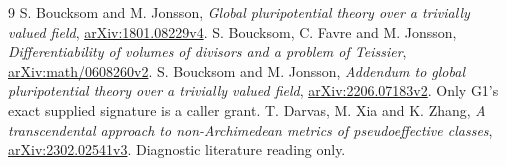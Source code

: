 \documentclass[10pt]{article}
\begin{document}
\begin{thebibliography}{9}
 S. Boucksom and M. Jonsson,
\emph{Global pluripotential theory over a trivially valued field},
\href{https://arxiv.org/pdf/1801.08229v4}{arXiv:1801.08229v4}.
 S. Boucksom, C. Favre and M. Jonsson,
\emph{Differentiability of volumes of divisors and a problem of Teissier},
\href{https://arxiv.org/html/math/0608260v2}{arXiv:math/0608260v2}.
 S. Boucksom and M. Jonsson,
\emph{Addendum to global pluripotential theory over a trivially valued field},
\href{https://arxiv.org/pdf/2206.07183v2}{arXiv:2206.07183v2}.
Only G1's exact supplied signature is a caller grant.
 T. Darvas, M. Xia and K. Zhang,
\emph{A transcendental approach to non-Archimedean metrics of
pseudoeffective classes},
\href{https://arxiv.org/pdf/2302.02541v3}{arXiv:2302.02541v3}.
Diagnostic literature reading only.
\end{thebibliography}
\end{document}
